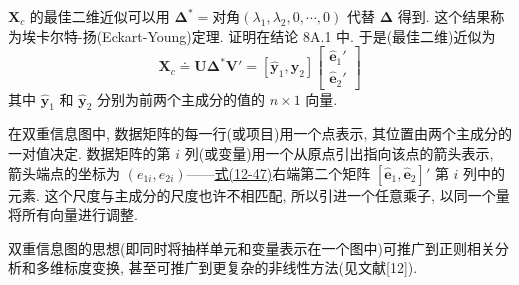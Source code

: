 $\mathbf{X}_c$ 的最佳二维近似可以用 $\boldsymbol{\Delta}^*=\text{对角}(\lambda_1,\lambda_2,0,\cdots,0)$ 代替 $\boldsymbol{\Delta}$ 得到. 这个结果称为埃卡尔特-扬(Eckart-Young)定理. 证明在结论 8A.1 中. 于是(最佳二维)近似为
\label{eq:12-47}
\begin{equation}
\mathbf{X}_c\doteq\mathbf{U}\boldsymbol{\Delta}^*\mathbf{V}'
=[\hat{\mathbf{y}}_1,\hat{\mathbf{y}}_2]\begin{bmatrix}\hat{\mathbf{e}}_1'\\ \hat{\mathbf{e}}_2'\end{bmatrix}
\tag{12-47}
\end{equation}
其中 $\hat{\mathbf{y}}_1$ 和 $\hat{\mathbf{y}}_2$ 分别为前两个主成分的值的 $n\times 1$ 向量.

在双重信息图中, 数据矩阵的每一行(或项目)用一个点表示, 其位置由两个主成分的一对值决定. 数据矩阵的第 $i$ 列(或变量)用一个从原点引出指向该点的箭头表示, 箭头端点的坐标为 $(e_{1i},e_{2i})$——\hyperref[eq:12-47]{式(12-47)}右端第二个矩阵 $[\hat{\mathbf{e}}_1,\hat{\mathbf{e}}_2]'$ 第 $i$ 列中的元素. 这个尺度与主成分的尺度也许不相匹配, 所以引进一个任意乘子, 以同一个量将所有向量进行调整.

双重信息图的思想(即同时将抽样单元和变量表示在一个图中)可推广到正则相关分析和多维标度变换, 甚至可推广到更复杂的非线性方法(见文献[12]).
